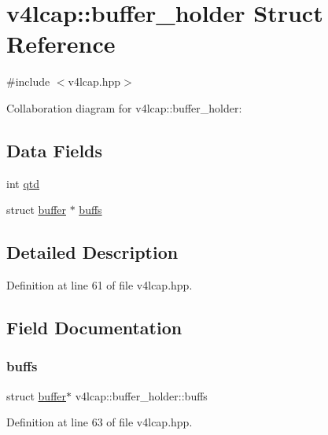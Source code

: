 \hypertarget{structv4lcap_1_1buffer__holder}{}\section{v4lcap\+:\+:buffer\+\_\+holder Struct Reference}
\label{structv4lcap_1_1buffer__holder}


{\ttfamily \#include $<$v4lcap.\+hpp$>$}



Collaboration diagram for v4lcap\+:\+:buffer\+\_\+holder\+:
\subsection*{Data Fields}
\begin{DoxyCompactItemize}
\item 
int \hyperlink{structv4lcap_1_1buffer__holder_a40424b4a28263425ab1bc05aac1490b4}{qtd}
\item 
struct \hyperlink{structv4lcap_1_1buffer}{buffer} $\ast$ \hyperlink{structv4lcap_1_1buffer__holder_afa53426fad11e19f7d615f564c979495}{buffs}
\end{DoxyCompactItemize}


\subsection{Detailed Description}


Definition at line 61 of file v4lcap.\+hpp.



\subsection{Field Documentation}
\mbox{\label{structv4lcap_1_1buffer__holder_afa53426fad11e19f7d615f564c979495}} 
\subsubsection{\texorpdfstring{buffs}{buffs}}
{\footnotesize\ttfamily struct \hyperlink{structv4lcap_1_1buffer}{buffer}$\ast$ v4lcap\+::buffer\+\_\+holder\+::buffs}



Definition at line 63 of file v4lcap.\+hpp.



